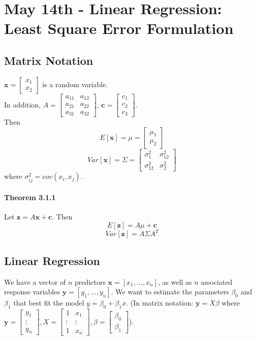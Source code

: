 \documentclass[11pt]{article}
\newcommand{\tb}[1]{\textbf{#1}}
\newcommand{\vx}[0]{\tb{x}}
\newcommand{\vy}[0]{\tb{y}}
\newcommand{\vz}[0]{\tb{z}}
\newcommand{\vc}[0]{\tb{c}}
\begin{document}
\section{May 14th - Linear Regression: Least Square Error Formulation}
\subsection{Matrix Notation}
$\vx = \begin{bmatrix}
	x_1 \\ x_2
\end{bmatrix}$ is a random variable. \\In addition, $A = \begin{bmatrix}
	a_{11} & a_{12} \\ a_{21} & a_{22} \\ a_{31} & a_{32}
\end{bmatrix}$, $\vc = \begin{bmatrix}
	c_1\\c_2\\c_3
\end{bmatrix}$.\\
Then $$E[\vx] = \mu = \begin{bmatrix}
	\mu_1 \\ \mu_2
\end{bmatrix}$$
$$Var[\vx] = \Sigma = \begin{bmatrix}
	\sigma^2_1 & \sigma^2_{12} \\ \sigma^2_{12} & \sigma^2_2
\end{bmatrix}$$
where $\sigma^2_{ij} = cov(x_i, x_j)$.
\paragraph{Theorem 3.1.1}
Let $\vz = A\vx + \vc$. Then $$E[\vz] = A\mu + \vc$$
$$Var[\vz] = A\Sigma A^T$$
\subsection{Linear Regression}
We have a vector of $n$ predictors $\vx = [x_1,\hdots,x_n]$, as well as $n$ associated response variables $\vy = [y_1, \hdots, y_n]$. We want to estimate the parameters $\beta_0$ and $\beta_1$ that best fit the model $y = \beta_0 + \beta_1 x$. (In matrix notation: $\vy = X\beta$ where $\vy = \begin{bmatrix}
	y_1 \\ \vdots \\ y_n \end{bmatrix}, X = \begin{bmatrix}
		1 & x_1 \\ \vdots & \vdots \\ 1 & x_n
	\end{bmatrix}, \beta = \begin{bmatrix} \beta_0 \\ \beta_1 \end{bmatrix}$).
\end{document}
